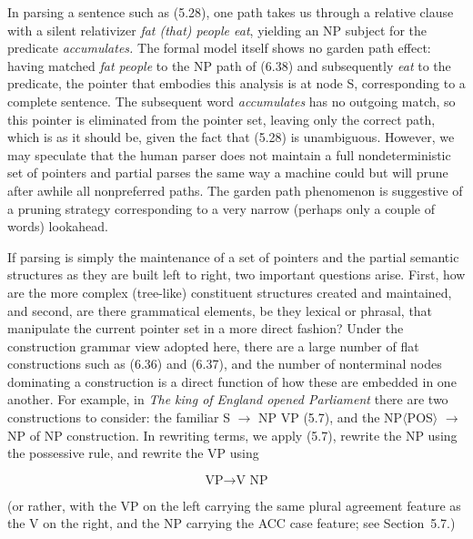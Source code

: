 \smallskip\noindent In parsing a sentence such as (5.28), one path takes us
through a relative clause with a silent relativizer {\it fat (that) people
  eat}, yielding an NP subject for the predicate {\it accumulates.} The formal
model itself shows no garden path effect: having matched {\it fat people} to
the NP path of (6.38) and subsequently {\it eat} to the predicate, the pointer
that embodies this analysis is at node S, corresponding to a complete
sentence. The subsequent word {\it accumulates} has no outgoing match, so this
pointer is eliminated from the pointer set, leaving only the correct path,
which is as it should be, given the fact that (5.28) is unambiguous.  However,
we may speculate that the human parser does not maintain a full
nondeterministic set of pointers and partial parses the same way a machine
could but will prune after awhile all nonpreferred paths. The garden path
phenomenon is suggestive of a pruning strategy corresponding to a very narrow
(perhaps only a couple of words) lookahead. 

If parsing is simply the maintenance of a set of pointers and the partial
semantic structures as they are built left to right, two important questions
arise.  First, how are the more complex (tree-like) constituent structures
created and maintained, and second, are there grammatical elements, be they
lexical or phrasal, that manipulate the current pointer set in a more direct
fashion? Under the construction grammar view adopted here, there are a large
number of flat constructions such as (6.36) and (6.37), and the number of
nonterminal nodes dominating a construction is a direct function of how these
are embedded in one another. For example, in {\it The king of England opened
  Parliament} there are two constructions to consider: the familiar S
$\rightarrow$ NP VP (5.7), and the NP$\langle$POS$\rangle$ $\rightarrow$ NP of
NP construction. In rewriting terms, we apply (5.7), rewrite the NP using the
possessive rule, and rewrite the VP using

\begin{equation}
\text{VP} \rightarrow \text{V NP}
\end{equation}

\noindent
(or rather, with the VP on the left carrying the same plural agreement feature
as the V on the right, and the NP carrying the ACC case feature; see
Section~5.7.)

